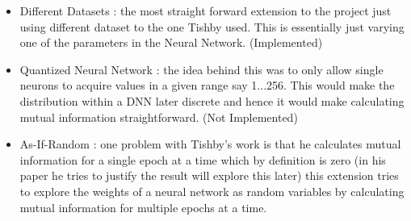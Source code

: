 \begin{itemize}
\begin{item}
      \begin{itemize}
        \item{
            Different Datasets : the most straight forward extension to the
            project just using different dataset to the one Tishby used. This is
            essentially just varying one of the parameters in the Neural
            Network. (Implemented)
          }
        \item{
            Quantized Neural Network : the idea behind this was to only allow
            single neurons to acquire values in a given range say 1...256. This
            would make the distribution within a DNN later discrete and hence it
            would make calculating mutual information straightforward. (Not
            Implemented)
          }
        \item{
            As-If-Random : one problem with Tishby's work is that he calculates
            mutual information for a single epoch at a time which by definition
            is zero (in his paper he tries to justify the result will explore
            this later) this extension tries to explore the weights of a neural
            network as random variables by calculating mutual information for
            multiple epochs at a time.
          }
      \end{itemize}
    \end{item}
\end{itemize}

